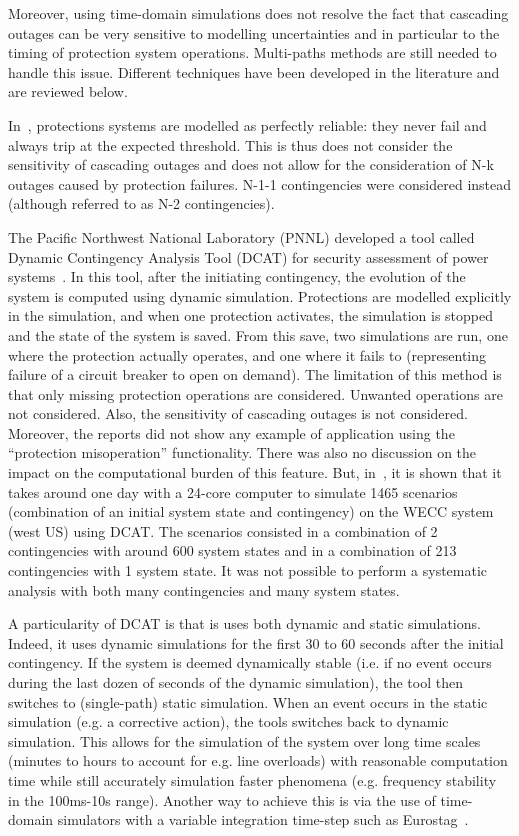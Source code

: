 Moreover, using time-domain simulations does not resolve the fact that cascading outages can be very sensitive to modelling uncertainties and in particular to the timing of protection system operations. Multi-paths methods are still needed to handle this issue. Different techniques have been developed in the literature and are reviewed below.

In~\cite{SongThesis, SongPaper, Preece1000RandomDynN-2}, protections systems are modelled as perfectly reliable: they never fail and always trip at the expected threshold. This is thus does not consider the sensitivity of cascading outages and does not allow for the consideration of N-k outages caused by protection failures. N-1-1 contingencies were considered instead (although referred to as N-2 contingencies).

The Pacific Northwest National Laboratory (PNNL) developed a tool called Dynamic Contingency Analysis Tool (DCAT) for security assessment of power systems~\cite{DCATphase1, DCATphase2}. In this tool, after the initiating contingency, the evolution of the system is computed using dynamic simulation. Protections are modelled explicitly in the simulation, and when one protection activates, the simulation is stopped and the state of the system is saved. From this save, two simulations are run, one where the protection actually operates, and one where it fails to (representing failure of a circuit breaker to open on demand). The limitation of this method is that only missing protection operations are considered. Unwanted operations are not considered. Also, the sensitivity of cascading outages is not considered. Moreover, the reports did not show any example of application using the ``protection misoperation'' functionality. There was also no discussion on the impact on the computational burden of this feature. But, in~\cite{DCAT_2023}, it is shown that it takes around one day with a 24-core computer to simulate 1465 scenarios (combination of an initial system state and contingency) on the WECC system (west US) using DCAT. The scenarios consisted in a combination of 2 contingencies with around 600 system states and in a combination of 213 contingencies with 1 system state. It was not possible to perform a systematic analysis with both many contingencies and many system states.

A particularity of DCAT is that is uses both dynamic and static simulations. Indeed, it uses dynamic simulations for the first 30 to 60 seconds after the initial contingency. If the system is deemed dynamically stable (i.e. if no event occurs during the last dozen of seconds of the dynamic simulation), the tool then switches to (single-path) static simulation. When an event occurs in the static simulation (e.g. a corrective action), the tools switches back to dynamic simulation. This allows for the simulation of the system over long time scales (minutes to hours to account for e.g. line overloads) with reasonable computation time while still accurately simulation faster phenomena (e.g. frequency stability in the 100ms-10s range). Another way to achieve this is via the use of time-domain simulators with a variable integration time-step such as Eurostag~\cite{STAG}.

